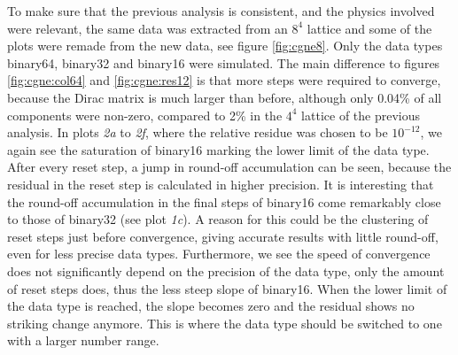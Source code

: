 \documentclass{article}
\theoremstyle{plain} %
\theoremstyle{convention} %
\theoremstyle{remark} %
\numberwithin{equation}{section}
\begin{document}
To make sure that the previous analysis is consistent, and the physics involved were relevant, the same data was extracted from an $8^4$ lattice and some of the plots were remade from the new data, see figure \ref{fig:cgne8}. Only the data types \gls{binary64}, \gls{binary32} and \gls{binary16} were simulated. The main difference to figures \ref{fig:cgne:col64} and \ref{fig:cgne:res12} is that more steps were required to converge, because the Dirac matrix is much larger than before, although only \num{0.04}\% of all components were non-zero, compared to \num{2}\% in the $4^4$ lattice of the previous analysis. In plots \textit{2a} to \textit{2f}, where the relative residue was chosen to be $10^{-12}$, we again see the saturation of \gls{binary16} marking the lower limit of the data type. After every reset step, a jump in round-off accumulation can be seen, because the residual in the reset step is calculated in higher precision. It is interesting that the round-off accumulation in the final steps of \gls{binary16} come remarkably close to those of \gls{binary32} (see plot \textit{1c}). A reason for this could be the clustering of reset steps just before convergence, giving accurate results with little round-off, even for less precise data types. Furthermore, we see the speed of convergence does not significantly depend on the precision of the data type, only the amount of reset steps does, thus the less steep slope of \gls{binary16}. When the lower limit of the data type is reached, the slope becomes zero and the residual shows no striking change anymore. This is where the data type should be switched to one with a larger number range.
\end{document}
